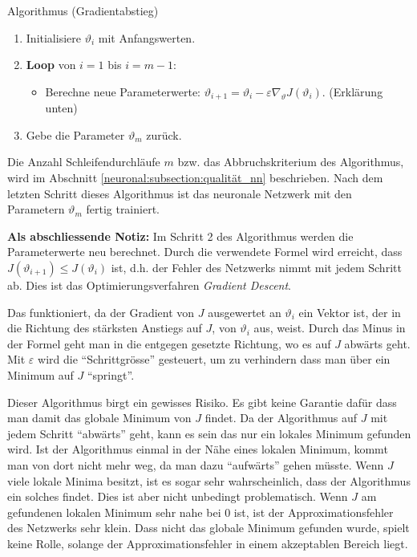 \begin{aufgabe}
    Algorithmus (Gradientabstieg)
    \begin{enumerate}
        \item Initialisiere \( \vartheta_i \) mit Anfangswerten.
        \item \textbf{Loop} von \( i = 1 \) bis \( i = m - 1 \):
        \begin{itemize}
            \item Berechne neue Parameterwerte: \( \vartheta_{i+1} = \vartheta_i - \varepsilon \nabla_\vartheta J\left(\vartheta_i\right) \). (Erklärung unten)
        \end{itemize}
        \item Gebe die Parameter \( \vartheta_m \) zurück.
    \end{enumerate}
\end{aufgabe}

Die Anzahl Schleifendurchläufe \( m \) bzw. das Abbruchskriterium des Algorithmus, wird im Abschnitt \ref{neuronal:subsection:qualität_nn} beschrieben.
Nach dem letzten Schritt dieses Algorithmus ist das neuronale Netzwerk mit den Parametern \( \vartheta_m \) fertig trainiert.

\textbf{Als abschliessende Notiz:} Im Schritt 2 des Algorithmus werden die Parameterwerte neu berechnet.
Durch die verwendete Formel wird erreicht, dass \( J(\vartheta_{i+1}) \leq J(\vartheta_i) \) ist, d.h. der Fehler des Netzwerks nimmt mit jedem Schritt ab.
Dies ist das Optimierungsverfahren \emph{Gradient Descent}.

Das funktioniert, da der Gradient von \( J \) ausgewertet an \( \vartheta_i \) ein Vektor ist, der in die Richtung des stärksten Anstiegs auf \( J \), von \(\vartheta_i \) aus, weist.
Durch das Minus in der Formel geht man in die entgegen gesetzte Richtung, wo es auf \( J \) abwärts geht. 
Mit \( \varepsilon \) wird die ``Schrittgrösse'' gesteuert, um zu verhindern dass man über ein Minimum auf \( J \) ``springt''.

Dieser Algorithmus birgt ein gewisses Risiko. 
Es gibt keine Garantie dafür dass man damit das globale Minimum von \( J \) findet.
Da der Algorithmus auf \( J \) mit jedem Schritt ``abwärts'' geht, kann es sein das nur ein lokales Minimum gefunden wird.
Ist der Algorithmus einmal in der Nähe eines lokalen Minimum, kommt man von dort nicht mehr weg, da man dazu ``aufwärts'' gehen müsste.
Wenn \( J \) viele lokale Minima besitzt, ist es sogar sehr wahrscheinlich, dass der Algorithmus ein solches findet.
Dies ist aber nicht unbedingt problematisch.
Wenn \( J \) am gefundenen lokalen Minimum sehr nahe bei 0 ist, ist der Approximationsfehler des Netzwerks sehr klein.
Dass nicht das globale Minimum gefunden wurde, spielt keine Rolle, solange der Approximationsfehler in einem akzeptablen Bereich liegt.

